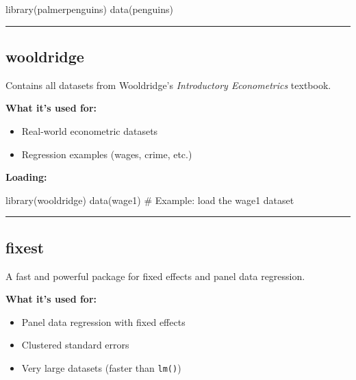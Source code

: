 \documentclass[
  letterpaper,
  DIV=11,
  numbers=noendperiod]{scrreprt}
\newenvironment{Shaded}{\begin{snugshade}}{\end{snugshade}}
\newcommand{\CommentTok}[1]{\textcolor[rgb]{0.37,0.37,0.37}{#1}}
\newcommand{\FunctionTok}[1]{\textcolor[rgb]{0.28,0.35,0.67}{#1}}
\newcommand{\NormalTok}[1]{\textcolor[rgb]{0.00,0.23,0.31}{#1}}
\providecommand{\tightlist}{%
  \setlength{\itemsep}{0pt}\setlength{\parskip}{0pt}}
\begin{document}
\begin{Shaded}
\begin{Highlighting}[]
\FunctionTok{library}\NormalTok{(palmerpenguins)}
\FunctionTok{data}\NormalTok{(penguins)}
\end{Highlighting}
\end{Shaded}

\begin{center}\rule{0.5\linewidth}{0.5pt}\end{center}

\subsection{wooldridge}\label{wooldridge}

Contains all datasets from Wooldridge's \emph{Introductory Econometrics}
textbook.

\textbf{What it's used for:}

\begin{itemize}
\tightlist
\item
  Real-world econometric datasets
\item
  Regression examples (wages, crime, etc.)
\end{itemize}

\textbf{Loading:}

\begin{Shaded}
\begin{Highlighting}[]
\FunctionTok{library}\NormalTok{(wooldridge)}
\FunctionTok{data}\NormalTok{(wage1)  }\CommentTok{\# Example: load the wage1 dataset}
\end{Highlighting}
\end{Shaded}

\begin{center}\rule{0.5\linewidth}{0.5pt}\end{center}

\subsection{fixest}\label{fixest}

A fast and powerful package for fixed effects and panel data regression.

\textbf{What it's used for:}

\begin{itemize}
\tightlist
\item
  Panel data regression with fixed effects
\item
  Clustered standard errors
\item
  Very large datasets (faster than \texttt{lm()})
\end{itemize}
\end{document}
